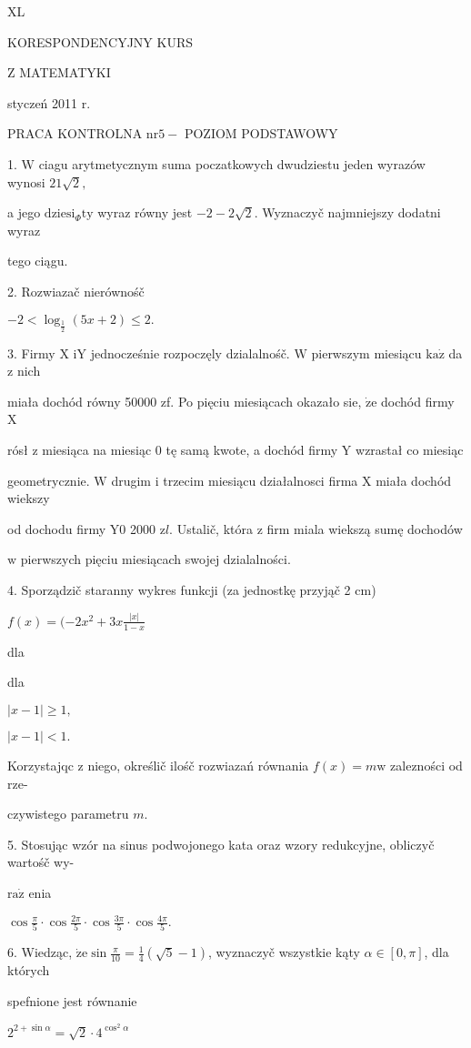\documentclass[a4paper,12pt]{article}
\begin{document}
XL

KORESPONDENCYJNY KURS

Z MATEMATYKI

styczeń 2011 r.

PRACA KONTROLNA $\mathrm{n}\mathrm{r} 5-$ POZIOM PODSTAWOWY

1. $\mathrm{W}$ ciagu arytmetycznym suma poczatkowych dwudziestu jeden wyrazów wynosi $21\sqrt{2},$

a jego $\mathrm{d}\mathrm{z}\mathrm{i}\mathrm{e}\mathrm{s}\mathrm{i}_{\Phi}\mathrm{t}\mathrm{y}$ wyraz równy jest $-2-2\sqrt{2}$. Wyznaczyč najmniejszy dodatni wyraz

tego ciągu.

2. Rozwiazač nierównośč

$-2<\log_{\frac{1}{2}}(5x+2)\leq 2.$

3. Firmy X $\mathrm{i}\mathrm{Y}$ jednocześnie rozpoczęly dzialalnośč. $\mathrm{W}$ pierwszym miesiącu $\mathrm{k}\mathrm{a}\dot{\mathrm{z}}$ da $\mathrm{z}$ nich

miała dochód równy 50000 zf. Po pięciu miesiącach okazało sie, $\dot{\mathrm{z}}\mathrm{e}$ dochód firmy X

rósł $\mathrm{z}$ miesiąca na miesiąc $0$ tę samą kwote, a dochód firmy $\mathrm{Y}$ wzrastał co miesiąc

geometrycznie. $\mathrm{W}$ drugim $\mathrm{i}$ trzecim miesiącu działalnosci firma X miała dochód wiekszy

od dochodu firmy $\mathrm{Y} 0$ 2000 $\mathrm{z}l$. Ustalič, która $\mathrm{z}$ firm miala wiekszą sumę dochodów

$\mathrm{w}$ pierwszych pięciu miesiącach swojej dzialalności.

4. Sporządzič staranny wykres funkcji (za jednostkę przyjąč 2 cm)

$f(x)=(-2x^{2}+3x\displaystyle \frac{|x|}{1-x}$

dla

dla

$|x-1|\geq 1,$

$|x-1|<1.$

Korzystajqc $\mathrm{z}$ niego, określič ilośč rozwiazań równania $f(x) =m \mathrm{w}$ zalezności od rze-

czywistego parametru $m.$

5. Stosując wzór na sinus podwojonego kata oraz wzory redukcyjne, obliczyč wartośč wy-

$\mathrm{r}\mathrm{a}\dot{\mathrm{z}}$ enia

$\displaystyle \cos\frac{\pi}{5}\cdot\cos\frac{2\pi}{5}\cdot\cos\frac{3\pi}{5}\cdot\cos\frac{4\pi}{5}.$

6. Wiedząc, $\dot{\mathrm{z}}\mathrm{e} \displaystyle \sin\frac{\pi}{10} = \displaystyle \frac{1}{4}(\sqrt{5}-1)$, wyznaczyč wszystkie kąty $\alpha \in [0,\pi]$, dla których

spefnione jest równanie

$2^{2+\sin\alpha}=\sqrt{2}\cdot 4^{\cos^{2}\alpha}$
\end{document}
